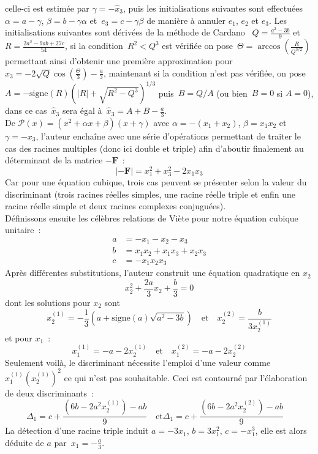 \documentclass[11pt]{amsart}
\newcommand{\mb}[1]{\mathbf{#1}}
\begin{document}
celle-ci est estim\'ee par $\gamma = - \hat{x}_{3}$, puis les initialisations suivantes sont effectu\'ees~$\alpha = a - \gamma$, $\beta = b - \gamma\alpha$ et~$e_{3} = c - \gamma\beta$ de mani\`ere \`a annuler $e_{1}$,
$e_{2}$ et $e_{3}$. Les initialisations suivantes sont d\'eriv\'ees de la m\'ethode de Cardano~ $Q = \frac{a^{2} - 3b}{9}$ et~$R = \frac{2a^3-9ab+27c}{54}$, si la condition~$R^{2}<Q^{3}$ est v\'erifi\'ee on pose~$\Theta=\arccos\left(\frac{R}{Q^{3/2}}\right)$
permettant ainsi d'obtenir une premi\`ere approximation pour $\hat{x}_{3}=-2\sqrt{Q}\cos\left(\frac{\Theta}{3}\right) - \frac{a}{3}$, maintenant si la condition n'est pas v\'erifi\'ee, on pose~$A=-\text{signe}(R)\left(|R|+\sqrt{R^{2}-Q^{3}}\right)^{1/3}$
puis~$B = Q/A$ (ou bien~$B=0$ si $A=0$), dans ce cas~$\hat{x}_{3}$ sera \'egal \`a~$\hat{x}_{3}=A+B-\frac{a}{3}$.\\

De $\mathcal{P}(x)=(x^2 + \alpha{}x + \beta)(x+\gamma)$ avec $\alpha=-(x_{1}+x_{2})$, $\beta=x_{1}x_{2}$ et $\gamma=-x_{3}$, l'auteur encha\^ine avec une s\'erie d'op\'erations
permettant de traiter le cas des racines multiples (donc ici double et triple) afin d'aboutir finalement au d\'eterminant de la matrice $-\mb{F}$~:
$$|-\mb{F}| = x_{1}^{2}+x_{3}^{2}-2x_{1}x_{3}$$
Car pour une \'equation cubique, trois cas peuvent se pr\'esenter selon la valeur du discriminant (trois racines r\'eelles simples, une racine r\'eelle triple et enfin une racine r\'eelle simple et deux
racines complexes conjugu\'ees).\\

D\'efinissons ensuite les c\'el\`ebres relations de Vi\`ete pour notre \'equation cubique unitaire~:
\[
\begin{split}
a &= -x_{1}-x_{2}-x_{3}\\
b &=  x_{1}x_{2}+x_{1}x_{3}+x_{2}x_{3}\\
c &= -x_{1}x_{2}x_{3}
\end{split}
\]
Apr\`es diff\'erentes substitutions, l'auteur construit une \'equation quadratique en $x_{2}$
$$x_{2}^{2}+\frac{2a}{3}x_{2}+\frac{b}{3}=0$$
dont les solutions pour $x_{2}$ sont
$$x_{2}^{(1)} = - \frac{1}{3}\left(a + \text{signe}(a)\sqrt{a^{2}-3b}\right) \quad \text{et} \quad x_{2}^{(2)} = \frac{b}{3x_{2}^{(1)}}$$
et pour $x_{1}$~:
$$x_{1}^{(1)} = -a - 2x_{2}^{(1)} \quad \text{et} \quad x_{1}^{(2)} = -a - 2x_{2}^{(2)}$$
Seulement voil\`a, le discriminant n\'ecessite l'emploi d'une valeur comme $x_{1}^{(1)}\left(x_{2}^{(1)}\right)^{2}$ ce qui n'est pas souhaitable.
Ceci est contourn\'e par l'\'elaboration de deux discriminants~:
$$\Delta_{1} = c + \frac{(6b - 2a^{2}x_{2}^{(1)}) - ab}{9} \quad \text{et} \Delta_{1} = c + \frac{(6b - 2a^{2}x_{2}^{(2)}) - ab}{9}\quad$$
La d\'etection d'une racine triple induit $a=-3x_{1}$, $b=3x_{1}^{2}$, $c=-x_{1}^{3}$, elle est alors d\'eduite de $a$ par~$x_{1} = -\frac{a}{3}$.\\
\end{document}

